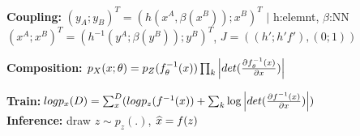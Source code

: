 \textbf{Coupling:} $(y_A; y_B)^T = (h(x^A, \beta(x^B)); x^B)^T$  $|$ h:elemnt, $\beta$:NN\\
$(x^A; x^B)^T = (h^{-1}(y^A; \beta(y^B)); y^B)^T$, $J = ((h'; h'f'),(0;1))$\\

\textbf{Composition:} $p_X(x; \theta) = p_Z(f_\theta^{-1}(x)) \prod_k \left\lvert det(\frac{\partial f_\theta^{-1}(x)}{\partial x}) \right\rvert$\\

\textbf{Train:}$log p_x(D) = \sum_{x}^{D} (log p_z(f^{-1}(x)) +  \sum_k \log \left\lvert det(\frac{\partial f^{-1}(x)}{\partial x}) \right\rvert)$\\
\textbf{Inference:} draw $z \sim p_z(.)$, $\widehat{x} = f(z)$\\

